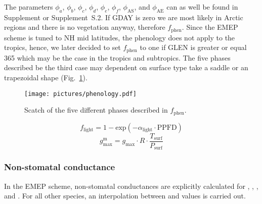 \documentclass[gmd, manuscript]{copernicus}
\begin{document}
%
The parameters $\phi_a$, $\phi_b$, $\phi_c$, $\phi_d$, $\phi_e$, $\phi_f$, $\phi_\text{AS}$, and $\phi_\text{AE}$ can as well be found in Supplement \citet{ACP:Simpson2012} or Supplement~S.2. If GDAY is zero we are most likely in Arctic regions and there is no vegetation anyway, therefore $f_\text{phen}$. Since the EMEP scheme is tuned to NH mid latitudes, the phenology does not apply to the tropics, hence, we later decided to set $f_\text{phen}$ to one if GLEN is greater or equal 365 which may be the case in the tropics and subtropics. The five phases described be the third case may dependent on surface type take a saddle or an trapezoidal shape (Fig.~\ref{fig:phenology}).
%
\begin{figure}[t]
  \texttt{[image: pictures/phenology.pdf]}
  \caption{Scatch of the five different phases described in $f_\text{phen}$.}
  \label{fig:phenology}
\end{figure}
%
\begin{equation}
  f_\text{light} = 1-\text{exp}(-\alpha_\text{light}\cdot \text{PPFD})
\end{equation}
%
\begin{equation}
  g^\text{m}_{\text{max}} = g_{\text{max}} \cdot R \cdot \frac{T_\text{surf}}{P_\text{surf}}
\end{equation} 
\subsubsection*{Non-stomatal conductance}
In the EMEP scheme, non-stomatal conductances are explicitly calculated for , , , and . For all other species, an interpolation between  and  values is carried out.
\end{document}
